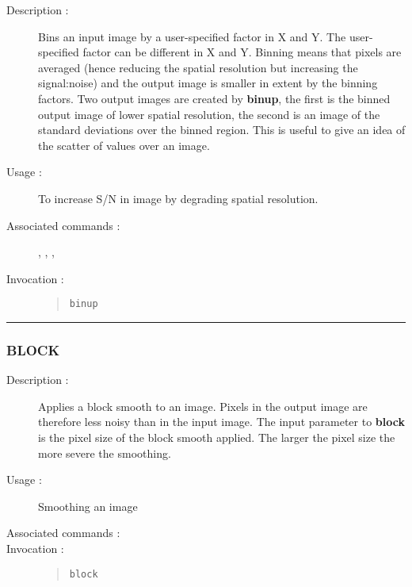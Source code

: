 \begin{description}

\item[Description :] Bins an input image by a user-specified factor in
X and Y.  The user-specified factor can be different in X and Y.
Binning means that pixels are averaged (hence reducing the spatial
resolution but increasing the signal:noise) and the output image is
smaller in extent by the binning factors.  Two output images are
created by {\bf binup}, the first is the binned output image of lower
spatial resolution, the second is an image of the standard deviations
over the binned region.  This is useful to give an idea of the scatter
of values over an image.

\item[Usage :] To increase S/N in image by degrading spatial resolution.

\item[Associated commands :] {\tt {}}, 
{\tt {}}, {\tt {}}, 
{\tt {}}

\item[Invocation :]

\begin{quote}{\tt  binup }\end{quote}

\end{description}

\hrule 
\subsubsection*{\label{BLOCK}BLOCK}

\begin{description}

\item[Description :] Applies a block smooth to an image.
Pixels in the output image are therefore less noisy than in the input
image.  The input parameter to {\bf block} is the pixel size of the
block smooth applied.  The larger the pixel size the more severe the
smoothing.

\item[Usage :] Smoothing an image
\item[Associated commands :] {\tt {}}
\item[Invocation :]

\begin{quote}{\tt block }\end{quote}

\end{description}

